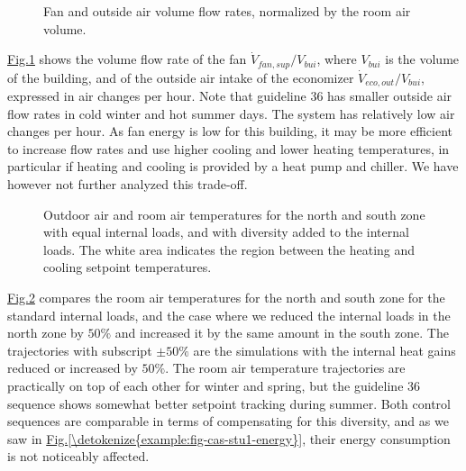 \documentclass[letterpaper,10pt, openany,english]{sphinxmanual}
\begin{document}
\begin{figure}[htbp]
\centering
\capstart

\noindent{}
\caption{Fan and outside air volume flow rates, normalized by the room air volume.}\label{\detokenize{example:id30}}\label{\detokenize{example:fig-normalized-flow-all}}\end{figure}

\hyperref[\detokenize{example:fig-normalized-flow-all}]{Fig.\@ \ref{\detokenize{example:fig-normalized-flow-all}}} shows the volume flow rate of the fan
\(\dot V_{fan,sup}/V_{bui}\), where \(V_{bui}\) is the volume of the building,
and of the outside air intake of the economizer \(\dot V_{eco,out}/V_{bui}\), expressed in air changes per hour.
Note that guideline 36 has smaller outside air flow rates in cold winter and hot summer days.
The system has relatively low air changes per hour. As fan
energy is low for this building, it may be more efficient to increase
flow rates and use higher cooling and lower heating temperatures,
in particular if heating and cooling is provided by a heat pump and chiller.
We have however not further analyzed this trade-off.

\begin{figure}[htbp]
\centering
\capstart

\noindent{}
\caption{Outdoor air and room air temperatures for the north and south zone with
equal internal loads, and with diversity added to the internal loads.
The white area indicates the region between the heating and cooling setpoint temperatures.}\label{\detokenize{example:id31}}\label{\detokenize{example:fig-troom-load-diversity}}\end{figure}

\hyperref[\detokenize{example:fig-troom-load-diversity}]{Fig.\@ \ref{\detokenize{example:fig-troom-load-diversity}}} compares the room air temperatures for the
north and south zone for the standard internal loads, and the case where we
reduced the internal loads in the north zone by \(50\%\) and increased it
by the same amount in the south zone.
The trajectories with subscript \(\pm 50\%\) are the simulations with
the internal heat gains reduced or increased by \(50\%\).
The room air temperature trajectories
are practically on top of each other for winter and spring, but
the guideline 36 sequence shows somewhat better setpoint tracking
during summer.
Both control sequences are comparable in terms of compensating for this
diversity, and as we saw in \hyperref[\detokenize{example:fig-cas-stu1-energy}]{Fig.\@ \ref{\detokenize{example:fig-cas-stu1-energy}}},
their energy consumption is not noticeably affected.
\end{document}
